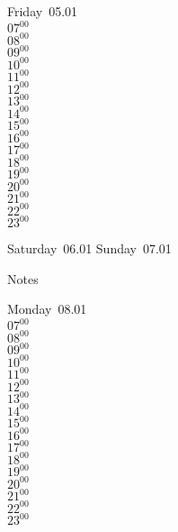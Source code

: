 \documentclass[11pt, a4paper]{book}\usepackage[]{graphicx}\usepackage[]{color}
\begin{document}
\begin{weekdaybox}
  Friday~05.01\\
  { 
  \vfill
  $07^{00}$\\
$08^{00}$\\
$09^{00}$\\
$10^{00}$\\
$11^{00}$\\
$12^{00}$\\
$13^{00}$\\
$14^{00}$\\
$15^{00}$\\
$16^{00}$\\
$17^{00}$\\
$18^{00}$\\
$19^{00}$\\
$20^{00}$\\
$21^{00}$\\
$22^{00}$\\
$23^{00}$\\
  }
\end{weekdaybox}
\begin{weekendbox}
  Saturday~06.01
  \tcblower
  Sunday~07.01
\end{weekendbox} %
\begin{notebox}
  Notes
\end{notebox}
\clearpage
\begin{headerbox}
\end{headerbox}
\begin{weekdaybox}
  Monday~08.01\\
  { 
  \vfill
  $07^{00}$\\
$08^{00}$\\
$09^{00}$\\
$10^{00}$\\
$11^{00}$\\
$12^{00}$\\
$13^{00}$\\
$14^{00}$\\
$15^{00}$\\
$16^{00}$\\
$17^{00}$\\
$18^{00}$\\
$19^{00}$\\
$20^{00}$\\
$21^{00}$\\
$22^{00}$\\
$23^{00}$\\
  }
\end{weekdaybox}
\end{document}
